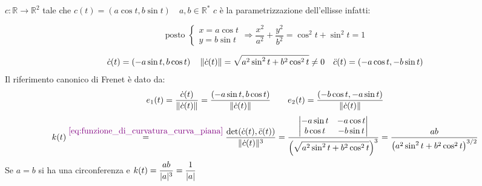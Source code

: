         \begin{esempio}
        $c \colon \mathbb{R} \to \mathbb{R}^2$ tale che $c(t)= \left(a \cos t, b \sin t \right) \quad a,b \in \mathbb{R}^*$ $c$ è la parametrizzazione 
        dell'ellisse infatti:

        \[ \text{posto }  \begin{cases*}
            x = a \cos t\\
            y = b \sin t
        \end{cases*} \Rightarrow \frac{x^2}{a^2} + \frac{y^2}{b^2} = \cos^2 t + \sin^2 t = 1 \]
        \begin{center}
        \end{center}
        \[ \dot{c}(t) = \left( -a \sin t, b \cos t \right) \quad \lVert\dot{c}(t)\rVert = \sqrt{a^2 \sin^2 t + b^2 \cos^2 t} \neq 0 \quad \ddot{c}(t) = \left( -a \cos t, -b \sin t \right) \]
        Il riferimento canonico di Frenet è dato da:
        \[ e_1(t) = \frac{\dot{c}(t)}{\lVert\dot{c}(t)\rVert}=\frac{(-a \sin t, b \cos t)}{\lVert\dot{c}(t)\rVert} \qquad e_2(t) = \frac{(-b \cos t, -a \sin t)}{\lVert\dot{c}(t)\rVert} \]
        \[ k(t) \overset{\textcolor{violet}{{\eqref{eq:funzione_di_curvatura_curva_piana}}}}{=}  \frac{\det(\dot{c}(t), \ddot{c}(t))}{\lVert\dot{c}(t)\rVert^3} = \frac{\begin{vmatrix} -a \sin t & -a \cos t \\ b \cos t & -b \sin t \end{vmatrix}}{\left( \sqrt{a^2 \sin^2 t + b^2 \cos^2 t} \right)^3} = \frac{ab}{\left( a^2 \sin^2 t + b^2 \cos^2 t \right)^{3/2}} \]
        Se $a=b$ si ha una circonferenza e $\displaystyle k(t) = \frac{ab}{\lvert a\rvert^3}=\frac{1}{\lvert a\rvert}$
        \end{esempio}
